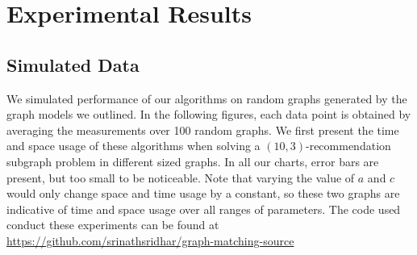 \section{Experimental Results}
\label{expsec}

\subsection{Simulated Data}
We simulated performance of our algorithms on random graphs generated
by the graph models we outlined.
In the following figures, each data
point is obtained by averaging the measurements over 100 random
graphs. We first present the time and space usage of these algorithms when
solving a $(10,3)$-recommendation subgraph problem in different sized graphs.
In all our charts, error bars are present, but too small to be noticeable.
Note that varying the value of $a$ and $c$ would only change space and time
usage by a constant, so these two graphs are indicative of time and space
usage over all ranges of parameters. The code used conduct these experiments
can be found at \url{https://github.com/srinathsridhar/graph-matching-source} \vs

